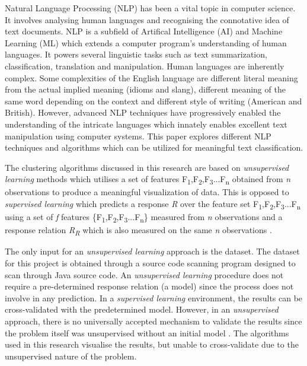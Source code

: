 \documentclass[conference]{IEEEtran}
\begin{document}
Natural Language Processing (NLP) has been a vital topic in computer science. It involves analysing human languages and recognising the connotative idea of text documents. NLP is a subfield of Artifical Intelligence (AI) and Machine Learning (ML) which extends a computer program's understanding of human languages. It powers several linguistic tasks such as text summarization, classification, translation and manipulation. Human languages are inherently complex. Some complexities of the English language are different literal meaning from the actual implied meaning (idioms and slang), different meaning of the same word depending on the context and different style of writing (American and British). However, advanced NLP techniques have progressively enabled the understanding of the intricate languages \cite{4368002} which innately enables excellent text manipulation using computer systems. This paper explores different NLP techniques and algorithms which can be utilized for meaningful text classification. 

The clustering algorithms discussed in this research are based on \textit{unsupervised learning} methods which utilises a set of features F\textsubscript{1},F\textsubscript{2},F\textsubscript{3}...F\textsubscript{n} obtained from \textit{n} observations to produce a meaningful visualization of data. This is opposed to \textit{supervised learning} which predicts a response \textit{R} over the feature set F\textsubscript{1},F\textsubscript{2},F\textsubscript{3}...F\textsubscript{n} using a set of \textit{f} features \{F\textsubscript{1},F\textsubscript{2},F\textsubscript{3}...F\textsubscript{n}\} measured from \textit{n} observations and a response relation \textit{R\textsubscript{R}} which is also measured on the same \textit{n} observations \cite{book_1}.

The only input for an \textit{unsupervised learning} approach is the dataset. The dataset for this project is obtained through a source code scanning program designed to scan through Java source code. An \textit{unsupervised learning} procedure does not require a pre-determined response relation (a model) since the process does not involve in any prediction. In a \textit{supervised learning} environment, the results can be cross-validated with the predetermined model. However, in an \textit{unsupervised} approach, there is no universally accepted mechanism to validate the results since the problem itself was unsupervised without an initial model \cite{book_1}. The algorithms used in this research visualise the results, but unable to cross-validate due to the unsupervised nature of the problem. 
\end{document}

